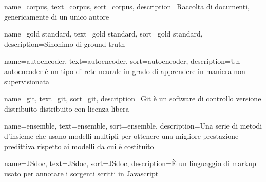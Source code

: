 







{
    name=corpus,
    text=corpus,
    sort=corpus,
    description={Raccolta di documenti, genericamente di un unico autore}
}

{
    name=gold standard,
    text=gold standard,
    sort=gold standard,
    description={Sinonimo di ground truth}
}

{
    name=autoencoder,
    text=autoencoder,
    sort=autoencoder,
    description={Un autoencoder è un tipo di rete neurale in grado di apprendere in maniera non supervisionata}
}


{
    name=git,
    text=git,
    sort=git,
    description={Git è un software di controllo versione distribuito distribuito con licenza libera}
}


{
    name=ensemble,
    text=ensemble,
    sort=ensemble,
    description={Una serie di metodi d'insieme che usano modelli multipli per ottenere una migliore prestazione predittiva rispetto ai modelli da cui è costituito}
}

{
    name=JSdoc,
    text=JSdoc,
    sort=JSdoc,
    description={È un linguaggio di markup usato per annotare i sorgenti scritti in Javascript}
}

